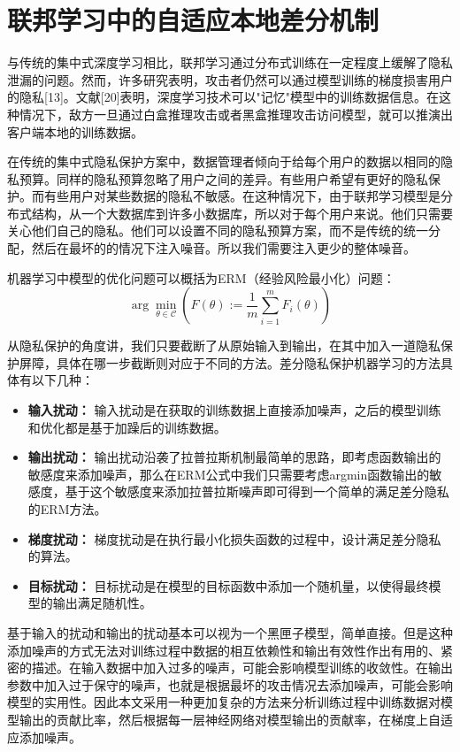 \chapter{联邦学习中的自适应本地差分机制}

\label{ch3}
与传统的集中式深度学习相比，联邦学习通过分布式训练在一定程度上缓解了隐私泄漏的问题。然而，许多研究表明，攻击者仍然可以通过模型训练的梯度损害用户的隐私[13]。文献[20]表明，深度学习技术可以"记忆"模型中的训练数据信息。在这种情况下，敌方一旦通过白盒推理攻击或者黑盒推理攻击访问模型，就可以推演出客户端本地的训练数据。

在传统的集中式隐私保护方案中，数据管理者倾向于给每个用户的数据以相同的隐私预算。同样的隐私预算忽略了用户之间的差异。有些用户希望有更好的隐私保护。而有些用户对某些数据的隐私不敏感。在这种情况下，由于联邦学习模型是分布式结构，从一个大数据库到许多小数据库，所以对于每个用户来说。他们只需要关心他们自己的隐私。他们可以设置不同的隐私预算方案，而不是传统的统一分配，然后在最坏的的情况下注入噪音。所以我们需要注入更少的整体噪音。

机器学习中模型的优化问题可以概括为ERM（经验风险最小化）问题：
\begin{equation}\label{eq:ERM}
\arg \min _{\theta \in \mathcal{C}}\left(F(\theta):=\frac{1}{m} \sum_{i=1}^{m} F_{i}(\theta)\right)
\end{equation}

从隐私保护的角度讲，我们只要截断了从原始输入到输出，在其中加入一道隐私保护屏障，具体在哪一步截断则对应于不同的方法。差分隐私保护机器学习的方法具体有以下几种：
\begin{itemize}
	\item \textbf{输入扰动：} 输入扰动是在获取的训练数据上直接添加噪声，之后的模型训练和优化都是基于加躁后的训练数据。
	\item \textbf{输出扰动：} 输出扰动沿袭了拉普拉斯机制最简单的思路，即考虑函数输出的敏感度来添加噪声，那么在ERM公式中我们只需要考虑argmin函数输出的敏感度，基于这个敏感度来添加拉普拉斯噪声即可得到一个简单的满足差分隐私的ERM方法。
	\item \textbf{梯度扰动：} 梯度扰动是在执行最小化损失函数的过程中，设计满足差分隐私的算法。
	\item \textbf{目标扰动：} 目标扰动是在模型的目标函数中添加一个随机量，以使得最终模型的输出满足随机性。
\end{itemize}

基于输入的扰动和输出的扰动基本可以视为一个黑匣子模型，简单直接。但是这种添加噪声的方式无法对训练过程中数据的相互依赖性和输出有效性作出有用的、紧密的描述。在输入数据中加入过多的噪声，可能会影响模型训练的收敛性。在输出参数中加入过于保守的噪声，也就是根据最坏的攻击情况去添加噪声，可能会影响模型的实用性。因此本文采用一种更加复杂的方法来分析训练过程中训练数据对模型输出的贡献比率，然后根据每一层神经网络对模型输出的贡献率，在梯度上自适应添加噪声。

